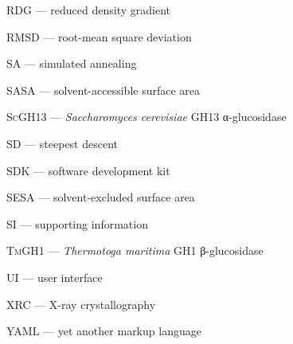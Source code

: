 \textsc{RDG} --- reduced density gradient

\textsc{RMSD} --- root-mean square deviation

\textsc{SA} --- simulated annealing

\textsc{SASA} --- solvent-accessible surface area

\textsc{ScGH13} --- \textit{Saccharomyces cerevisiae} GH13 α-glucosidase

\textsc{SD} --- steepest descent

\textsc{SDK} --- software development kit

\textsc{SESA} --- solvent-excluded surface area

\textsc{SI} --- supporting information

\textsc{TmGH1} --- \textit{Thermotoga maritima} GH1 β-glucosidase

\textsc{UI} --- user interface

\textsc{XRC} --- X-ray crystallography

\textsc{YAML} --- yet another markup language